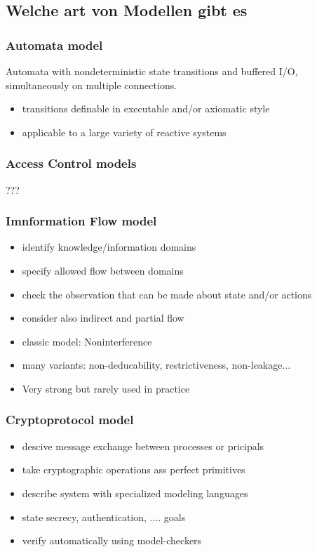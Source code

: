 \documentclass[a4paper, 12pt]{article}
\begin{document}
\subsection{Welche art von Modellen gibt es}
\subsubsection{Automata model}
Automata with nondeterministic state transitions and buffered I/O, simultaneously on multiple connections.
\begin{itemize}
\item transitions definable in executable and/or axiomatic style
\item applicable to a large variety of reactive systems
\end{itemize}

\subsubsection{Access Control models}
???

\subsubsection{Imnformation Flow model}
\begin{itemize}
\item identify knowledge/information domains
\item specify allowed flow between domains
\item check the observation that can be made about state and/or actions
\item consider also indirect and partial flow
\item classic model: Noninterference
\item many variants: non-deducability, restrictiveness, non-leakage...
\item Very strong but rarely used in practice
\end{itemize}

\subsubsection{Cryptoprotocol model}
\begin{itemize}
\item descive message exchange between processes or pricipals
\item take cryptographic operations ass perfect primitives
\item describe system with specialized modeling languages
\item state secrecy, authentication, .... goals
\item verify automatically using model-checkers
\end{itemize}
\end{document}

